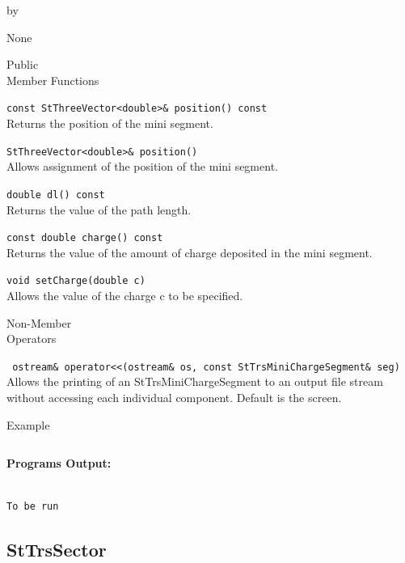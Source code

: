 \documentclass[twoside]{article}
\newcommand{\entrylabel}[1]{\mbox{\textbf{{#1}}}\hfil}%
\newenvironment{entry}
{\begin{list}{}%
    {\renewcommand{\makelabel}{\entrylabel}%
     \setlength{\labelwidth}{90pt}%
     \setlength{\leftmargin}{\labelwidth}
     \advance\leftmargin by \labelsep%
      }%
    }%
  {\end{list}}
\newcommand{\Entrylabel}[1]%
{\raisebox{0pt}[1ex][0pt]{\makebox[\labelwidth][l]%
    {\parbox[t]{\labelwidth}{\hspace{0pt}\textbf{{#1}}}}}}
\newenvironment{Entry}%
{\renewcommand{\entrylabel}{\Entrylabel}\begin{entry}}%
  {\end{entry}}
\begin{document}
\begin{Entry}
  None

\item[Public \\ Member Functions]

  \verb+const StThreeVector<double>& position() const+\\
  Returns the position of the mini segment.

  \verb+StThreeVector<double>& position()+\\
  Allows assignment of the position of the mini segment.
  
  \verb+double dl() const+\\
  Returns the value of the path length.

  \verb+const double charge() const+\\
  Returns the value of the amount of charge deposited in the mini segment.

  \verb+void setCharge(double c)+\\
  Allows the value of the charge c to be specified.
  
\item[Non-Member \\ Operators]

  \verb+ ostream& operator<<(ostream& os, const StTrsMiniChargeSegment& seg)+\\
  Allows the printing of an StTrsMiniChargeSegment to an output file stream
  without accessing each individual component.  Default is the screen.

\item[Example]

{\footnotesize
\begin{verbatim}

\end{verbatim}
}%
{\bf Programs Output:}
{\footnotesize
\begin{verbatim}

To be run

\end{verbatim}
} %

\end{Entry}
\clearpage

%
%
\subsection{StTrsSector} 
\label{sec:stTrsSector}
\end{document}
